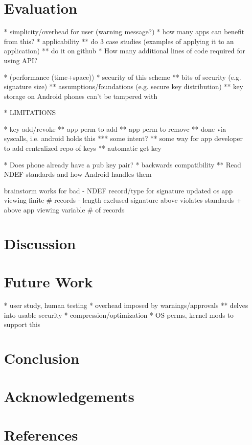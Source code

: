 \documentclass[12pt]{article}
\begin{document}
\section{Evaluation}
* simplicity/overhead for user (warning message?)
* how many apps can benefit from this?
* applicability
** do 3 case studies (examples of applying it to an application)
** do it on github
* How many additional lines of code required for using API?

* (performance (time+space))
* security of this scheme
** bits of security (e.g. signature size)
** assumptions/foundations (e.g. secure key distribution)
** key storage on Android phones can't be tampered with

* LIMITATIONS

* key add/revoke
** app perm to add
** app perm to remove
** done via syscalls, i.e. android holds this
*** some intent?
** some way for app developer to add centralized repo of keys
** automatic get key

* Does phone already have a pub key pair?
* backwards compatibility
** Read NDEF standards and how Android handles them

brainstorm                         works for                           bad
- NDEF record/type for signature   updated os
                                   app viewing finite \# records
- length exclused signature        above                               violates standards
  + above                          app viewing variable \# of records   

\section{Discussion}

\section{Future Work}
* user study, human testing
* overhead imposed by warnings/approvals
** delves into usable security
* compression/optimization
* OS perms, kernel mods to support this

\section{Conclusion}

\section{Acknowledgements}

\section{References}
\end{document}
